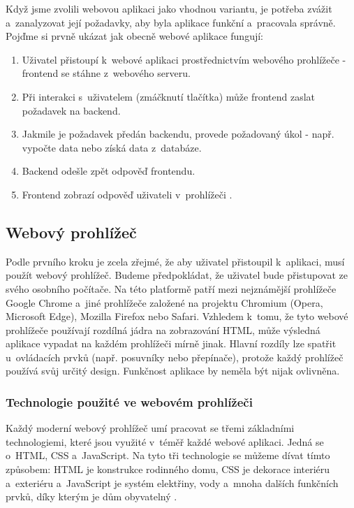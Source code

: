 Když jsme zvolili webovou aplikaci jako vhodnou variantu, je potřeba zvážit a~zanalyzovat její požadavky, aby byla aplikace funkční a~pracovala správně. Pojďme si prvně ukázat jak obecně webové aplikace fungují:

\begin{enumerate}
    \item Uživatel přistoupí k~webové aplikaci prostřednictvím webového prohlížeče - frontend se stáhne z~webového serveru.
    \item Při interakci s~uživatelem (zmáčknutí tlačítka) může frontend zaslat požadavek na backend.
    \item Jakmile je požadavek předán backendu, provede požadovaný úkol - např. vypočte data nebo získá data z~databáze.
    \item Backend odešle zpět odpověď frontendu.
    \item Frontend zobrazí odpověď uživateli v~prohlížeči \cite{frontend-backend}.
\end{enumerate}

\subsection{Webový prohlížeč}

Podle prvního kroku je zcela zřejmé, že aby uživatel přistoupil k~aplikaci, musí použít webový prohlížeč. Budeme předpokládat, že uživatel bude přistupovat ze svého osobního počítače. Na této platformě patří mezi nejznámější prohlížeče Google Chrome a~jiné prohlížeče založené na projektu Chromium (Opera, Microsoft Edge), Mozilla Firefox nebo Safari. Vzhledem k~tomu, že tyto webové prohlížeče používají rozdílná jádra na zobrazování HTML, může výsledná aplikace vypadat na každém prohlížeči mírně jinak. Hlavní rozdíly lze spatřit u~ovládacích prvků (např. posuvníky nebo přepínače), protože každý prohlížeč používá svůj určitý design. Funkčnost aplikace by neměla být nijak ovlivněna.

\subsubsection*{Technologie použité ve webovém prohlížeči}

Každý moderní webový prohlížeč umí pracovat se třemi základními technologiemi, které jsou využité v~téměř každé webové aplikaci. Jedná se o~HTML, CSS a~JavaScript. Na tyto tři technologie se můžeme dívat tímto způsobem: HTML je konstrukce rodinného domu, CSS je dekorace interiéru a~exteriéru a~JavaScript je systém elektřiny, vody a~mnoha dalších funkčních prvků, díky kterým je dům obyvatelný \cite{what-is-html}.

